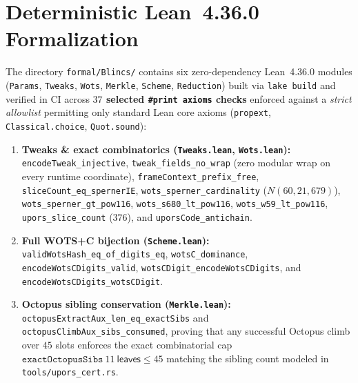\documentclass[11pt,a4paper]{article}
\theoremstyle{definition}
\theoremstyle{remark}
\newcommand{\WOTSC}{\textsf{WOTS+C}}
\begin{document}
\section{Deterministic Lean~4.36.0 Formalization}
\label{sec:lean}

The directory \texttt{formal/Blincs/} contains six zero-dependency Lean~4.36.0 modules (\texttt{Params}, \texttt{Tweaks}, \texttt{Wots}, \texttt{Merkle}, \texttt{Scheme}, \texttt{Reduction}) built via \texttt{lake build} and verified in CI across \textbf{$37$ selected \texttt{\#print axioms} checks} enforced against a \emph{strict allowlist} permitting only standard Lean core axioms (\texttt{propext}, \texttt{Classical.choice}, \texttt{Quot.sound}):
{\sloppy
\begin{enumerate}[leftmargin=1.4em,itemsep=2pt]
  \item \textbf{Tweaks \& exact combinatorics (\texttt{Tweaks.lean}, \texttt{Wots.lean}):} \texttt{encodeTweak\_\allowbreak injective}, \texttt{tweak\_\allowbreak fields\_\allowbreak no\_\allowbreak wrap} (zero modular wrap on every runtime coordinate), \texttt{frameContext\_\allowbreak prefix\_\allowbreak free}, \texttt{sliceCount\_\allowbreak eq\_\allowbreak spernerIE}, \texttt{wots\_\allowbreak sperner\_\allowbreak cardinality} ($N(60, 21, 679)$), \texttt{wots\_\allowbreak sperner\_\allowbreak gt\_\allowbreak pow116}, \texttt{wots\_\allowbreak s680\_\allowbreak lt\_\allowbreak pow116}, \texttt{wots\_\allowbreak w59\_\allowbreak lt\_\allowbreak pow116}, \texttt{upors\_\allowbreak slice\_\allowbreak count} ($376$), and \texttt{uporsCode\_\allowbreak antichain}.
  \item \textbf{Full \WOTSC{} bijection (\texttt{Scheme.lean}):} \texttt{validWotsHash\_\allowbreak eq\_\allowbreak of\_\allowbreak digits\_\allowbreak eq}, \texttt{wotsC\_\allowbreak dominance}, \texttt{encodeWotsCDigits\_\allowbreak valid}, \texttt{wotsCDigit\_\allowbreak encodeWotsCDigits}, and \texttt{encodeWotsCDigits\_\allowbreak wotsCDigit}.
  \item \textbf{Octopus sibling conservation (\texttt{Merkle.lean}):} \texttt{octopusExtractAux\_\allowbreak len\_\allowbreak eq\_\allowbreak exactSibs} and \texttt{octopusClimbAux\_\allowbreak sibs\_\allowbreak consumed}, proving that any successful Octopus climb over $45$ slots enforces the exact combinatorial cap $\texttt{exactOctopusSibs}\ 11\ \mathsf{leaves} \le 45$ matching the sibling count modeled in \texttt{tools/upors\_\allowbreak cert.rs}.

\end{enumerate}}
\end{document}
